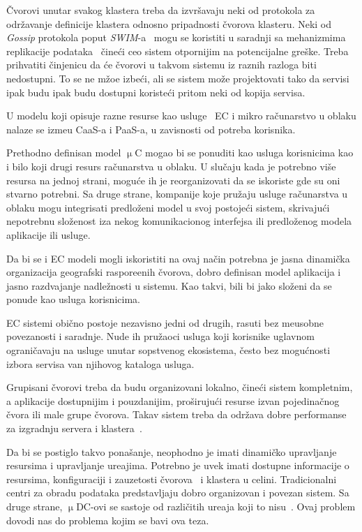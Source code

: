 \v Cvorovi unutar svakog klastera treba da izvr\v savaju neki od protokola za odr\v zavanje definicije klastera odnosno pripadnosti \v cvorova klasteru. Neki od \textit{Gossip} protokola poput \textit{SWIM}-a~\cite{DasGM02} mogu se koristiti u saradnji sa mehanizmima replikacije podataka~\cite {LiBCL20, CauCBFCEB16, CRDTS_Nuno} \v cine\'ci ceo sistem otpornijim na potencijalne gre\v ske. Treba prihvatiti \v cinjenicu da \'ce \v cvorovi u takvom sistemu iz raznih razloga biti nedostupni. To se ne m\v zoe izbe\'ci, ali se sistem mo\v ze projektovati tako da servisi ipak budu ipak budu dostupni koriste\'ci pritom neki od kopija servisa.

U modelu koji opisuje razne resurse kao usluge~\cite{DuanFZSNH15} EC i mikro ra\v cunarstvo u oblaku nalaze se izme\dj u CaaS-a i PaaS-a, u zavisnosti od potreba korisnika.

Prethodno definisan model $\upmu$C mogao bi se ponuditi kao usluga korisnicima kao i bilo koji drugi resurs ra\v cunarstva u oblaku. U slu\v caju kada je potrebno vi\v se resursa na jednoj strani, mogu\'ce ih je reorganizovati da se iskoriste gde su oni stvarno potrebni. Sa druge strane, kompanije koje pru\v zaju usluge ra\v cunarstva u oblaku mogu integrisati predlo\v zeni model u svoj postoje\'ci sistem, skrivaju\'ci nepotrebnu slo\v zenost iza nekog komunikacionog interfejsa ili predlo\v zenog modela aplikacije ili usluge.

Da bi se i EC modeli mogli iskoristiti na ovaj na\v cin potrebna je jasna dinami\v cka organizacija geografski raspore\dj enih \v cvorova, dobro definisan model aplikacija i jasno razdvajanje nadle\v znosti u sistemu. Kao takvi, bili bi jako slo\v zeni da se ponude kao usluga korisnicima. 

EC sistemi obi\v cno postoje nezavisno jedni od drugih, rasuti bez me\dj usobne povezanosti i saradnje. Nude ih pru\v zaoci usluga koji korisnike uglavnom ograni\v cavaju na usluge unutar sopstvenog ekosistema, \v cesto bez mogu\'cnosti izbora servisa van njihovog kataloga usluga. 

Grupisani čvorovi treba da budu organizovani lokalno, \v cine\'ci sistem kompletnim, a aplikacije dostupnijim i pouzdanijim, pro\v siruju\'ci resurse izvan pojedina\v cnog \v cvora ili male grupe \v cvorova. Takav sistem treba da odr\v zava dobre performanse za izgradnju servera i klastera~\cite{ArocaG12}.

Da bi se postiglo takvo pona\v sanje, neophodno je imati dinami\v cko upravljanje resursima i upravljanje ure\dj ajima. Potrebno je uvek imati dostupne informacije o resursima, konfiguraciji i zauzetosti \v cvorova~\cite{GubbiBMP13, WangZZWYW17} i klastera u celini. Tradicionalni centri za obradu podataka predstavljaju dobro organizovan i povezan sistem. Sa druge strane, $\upmu$DC-ovi se sastoje od razli\v citih ure\dj aja koji to nisu~\cite{JiangCGZW19}. Ovaj problem dovodi nas do problema kojim se bavi ova teza.

